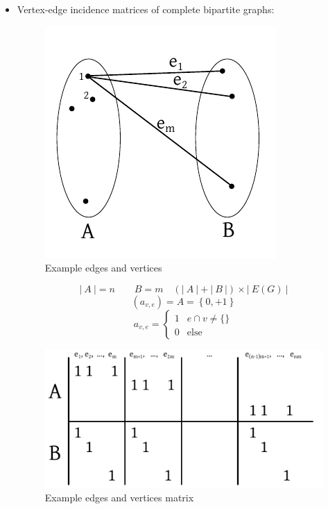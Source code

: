 \documentclass[a4paper]{article}
\theoremstyle{definition}
\newcommand{\card}[1]{\left|\:\!#1\:\!\right|}
\newcommand{\set}[1]{\left\{#1\right\}}
\begin{document}
\begin{itemize}
  \item
    Vertex-edge incidence matrices of complete bipartite graphs:
    \begin{figure}[!ht]
      \begin{center}
        \includegraphics{img/edge_vertex_matrix.pdf}
        \caption{Example edges and vertices}
        \label{fig:example-edges-vertices}
      \end{center}
    \end{figure}
    \[
      \card{A} = n \qquad B = m \quad (\card{A} + \card{B}) \times \card{E(G)}
    \] \[
      (a_{v,e}) = A = \set{0, + 1}
    \] \[
      a_{v,e} = \begin{cases}
       1   & e \cap v \neq \{\} \\
       0   & \text{else}
      \end{cases}
    \]
    \begin{figure}[!ht]
      \begin{center}
        \includegraphics{img/vertex_edge_matrix_structure.pdf}
        \caption{Example edges and vertices matrix}
        \label{fig:example-edges-vertices-matrix}
      \end{center}
    \end{figure}
\end{itemize}
\end{document}
